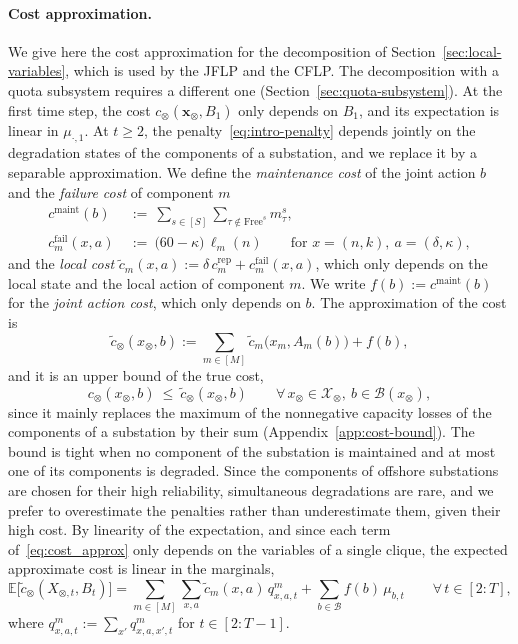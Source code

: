 \documentclass{article}
\begin{document}
\paragraph{Cost approximation.}
\label{sec:intro-approx}
We give here the cost approximation for the decomposition of Section~\ref{sec:local-variables}, which is used by the
JFLP and the CFLP. The decomposition with a quota subsystem requires a different one
(Section~\ref{sec:quota-subsystem}). At the first time step, the cost $c_\otimes(\mathbf{x}_\otimes, B_1)$ only depends
on $B_1$, and its expectation is linear in $\mu_{\cdot,1}$. At $t \ge 2$, the penalty~\eqref{eq:intro-penalty} depends
jointly on the degradation states of the components of a substation, and we replace it by a separable approximation. We define the \emph{maintenance
cost} of the joint action $b$ and the \emph{failure cost} of component $m$
\begin{align}
c^{\mathrm{maint}}(b) \ &:=\ \sum_{s \in [S]} \sum_{\tau \notin \text{Free}^s} m^s_\tau,
\label{eq:intro-maintenance-cost}\\
c^{\mathrm{fail}}_m(x, a) \ &:=\ \big(60 - \kappa\big)\, \ell_m(n) \qquad \text{for } x = (n, k),\ a = (\delta, \kappa),
\label{eq:intro-failure-cost}
\end{align}
and the \emph{local cost} $\tilde c_m(x, a) := \delta\, c^{\mathrm{rep}}_m + c^{\mathrm{fail}}_m(x, a)$, which only
depends on the local state and the local action of component $m$. We write $f(b) := c^{\mathrm{maint}}(b)$ for the
\emph{joint action cost}, which only depends on $b$. The approximation of the cost is
\begin{equation}
\label{eq:cost_approx}
\tilde c_\otimes(x_\otimes,b) := \sum_{m \in [M]} \tilde c_m\big(x_m, A_m(b)\big) + f(b),
\end{equation}
and it is an upper bound of the true cost,
\begin{equation}
\label{eq:intro-cost-approx}
c_\otimes(x_\otimes, b) \ \le\ \tilde c_\otimes(x_\otimes, b) \qquad \forall\, x_\otimes \in \mathcal{X}_\otimes,\ b \in
\mathcal{B}(x_\otimes),
\end{equation}
since it mainly replaces the maximum of the nonnegative capacity losses of the components of a substation by their sum
(Appendix~\ref{app:cost-bound}). The bound is tight when no component of the substation is maintained and at most one
of its components is degraded. Since the components of offshore substations are chosen for their high reliability,
simultaneous degradations are rare, and we prefer to overestimate the penalties rather than underestimate them, given
their high cost. By linearity of the expectation, and since each term of~\eqref{eq:cost_approx} only depends on the
variables of a single clique, the expected approximate cost is linear in the marginals,
\begin{equation}
\label{eq:cost_approx_expectation}
\mathbb{E}\big[\tilde c_\otimes(X_{\otimes,t}, B_t)\big]
= \sum_{m \in [M]} \sum_{x, a} \tilde c_m(x, a)\, q^m_{x,a,t} + \sum_{b \in \mathcal{B}} f(b)\, \mu_{b,t}
\qquad \forall\, t \in [2:T],
\end{equation}
where $q^m_{x,a,t} := \sum_{x'} q^m_{x,a,x',t}$ for $t \in [2:T-1]$.
\end{document}
